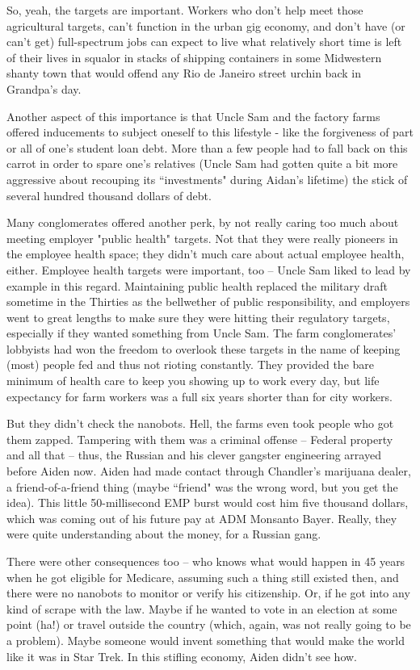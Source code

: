 \documentclass[11pt]{book}
\begin{document}
	So, yeah, the targets are important. Workers who don't help meet those agricultural targets, can't function in the urban gig economy, and don't have (or can't get) full-spectrum jobs can expect to live what relatively short time is left of their lives in squalor in stacks of shipping containers in some Midwestern shanty town that would offend any Rio de Janeiro street urchin back in Grandpa's day.
	
	Another aspect of this importance is that Uncle Sam and the factory farms offered inducements to subject oneself to this lifestyle - like the forgiveness of part or all of one's student loan debt. More than a few people had to fall back on this carrot in order to spare one's relatives (Uncle Sam had gotten quite a bit more aggressive about recouping its ``investments" during Aidan's lifetime) the stick of several hundred thousand dollars of debt. 
	
	Many conglomerates offered another perk, by not really caring too much about meeting employer "public health" targets. Not that they were really pioneers in the employee health space; they didn't much care about actual employee health, either. Employee health targets were important, too -- Uncle Sam liked to lead by example in this regard. Maintaining public health replaced the military draft sometime in the Thirties as the bellwether of public responsibility, and employers went to great lengths to make sure they were hitting their regulatory targets, especially if they wanted something from Uncle Sam. The farm conglomerates' lobbyists had won the freedom to overlook these targets in the name of keeping (most) people fed and thus not rioting constantly. They provided the bare minimum of health care to keep you showing up to work every day, but life expectancy for farm workers was a full six years shorter than for city workers. 
	
	But they didn't check the nanobots. Hell, the farms even took people who got them zapped. Tampering with them was a criminal offense -- Federal property and all that -- thus, the Russian and his clever gangster engineering arrayed before Aiden now. Aiden had made contact through Chandler's marijuana dealer, a friend-of-a-friend thing (maybe ``friend" was the wrong word, but you get the idea). This little 50-millisecond EMP burst would cost him five thousand dollars, which was coming out of his future pay at ADM Monsanto Bayer. Really, they were quite understanding about the money, for a Russian gang. 
	
	There were other consequences too -- who knows what would happen in 45 years when he got eligible for Medicare, assuming such a thing still existed then, and there were no nanobots to monitor or verify his citizenship. Or, if he got into any kind of scrape with the law. Maybe if he wanted to vote in an election at some point (ha!) or travel outside the country (which, again, was not really going to be a problem). Maybe someone would invent something that would make the world like it was in Star Trek. In this stifling economy, Aiden didn't see how. 
	
\end{document}
